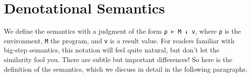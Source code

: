 \hypertarget{denotational-semantics}{%
\section{Denotational Semantics}\label{denotational-semantics}}

We define the semantics with a judgment of the form
\texttt{ρ\ ⊢\ M\ ↓\ v}, where \texttt{ρ} is the environment, \texttt{M}
the program, and \texttt{v} is a result value. For readers familiar with
big-step semantics, this notation will feel quite natural, but don't let
the similarity fool you. There are subtle but important differences! So
here is the definition of the semantics, which we discuss in detail in
the following paragraphs.

\begin{fence}
\begin{code}%
\>[0]\AgdaSpace{}%
\AgdaSpace{}%
\<%
\\
%
\\[\AgdaEmptyExtraSkip]%
\>[0]\AgdaSpace{}%
\AgdaSpace{}%
\AgdaSymbol{:}\AgdaSpace{}%
\AgdaSymbol{\}}\AgdaSpace{}%
\AgdaSpace{}%
\AgdaSpace{}%
\AgdaSpace{}%
\AgdaSpace{}%
\AgdaSymbol{(}\AgdaSpace{}%
\AgdaSpace{}%
\AgdaSymbol{)}\AgdaSpace{}%
\AgdaSpace{}%
\AgdaSpace{}%
\AgdaSpace{}%
\AgdaSpace{}%
\<%
\\
%
\\[\AgdaEmptyExtraSkip]%
\>[0][@{}l@{\AgdaIndent{0}}]%
\>[2]%
\>[643I]\AgdaSymbol{:}\AgdaSpace{}%
\AgdaSpace{}%
\AgdaSymbol{\{}\AgdaSymbol{\}}\AgdaSpace{}%
\AgdaSymbol{\{}\AgdaSpace{}%
\AgdaSymbol{:}\AgdaSpace{}%
\AgdaSpace{}%
\AgdaSymbol{\}}\AgdaSpace{}%
\AgdaSymbol{\{}\AgdaSymbol{\}}\<%
\\
\>[.][@{}l@{}]\<[643I]%
\>[6]\AgdaComment{---------------}\<%
\\
\>[2][@{}l@{\AgdaIndent{0}}]%
\>[4]\AgdaSpace{}%
\AgdaSpace{}%
\AgdaSpace{}%
\AgdaSymbol{(}\AgdaSpace{}%

\end{code}
\end{fence}
